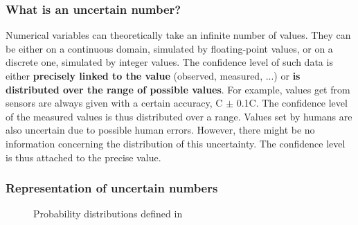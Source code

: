 \subsubsection{What is an uncertain number?}
Numerical variables can theoretically take an infinite number of values. 
They can be either on a continuous domain, simulated by floating-point values, or on a discrete one, simulated by integer values.
The confidence level of such data is either \textbf{precisely linked to the value} (observed, measured, ...) or \textbf{is distributed over the range of possible values}.
For example, values get from sensors are always given with a certain accuracy, \textdegree C $\pm$ 0.1\textdegree C.
The confidence level of the measured values is thus distributed over a range.
Values set by humans are also uncertain due to possible human errors.
However, there might be no information concerning the distribution of this uncertainty.
The confidence level is thus attached to the precise value.

\subsubsection{Representation of uncertain numbers}
\label{subsubsec:d-u-repr-unum}

\begin{figure*}
    \centering
    \hfill
    \hfill
    \hfill
    \caption{Probability distributions defined in \languageName{}}
    \label{fig:example-proba-dist}
\end{figure*}

